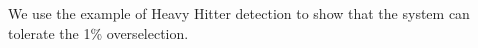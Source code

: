 \documentclass[a4paper,10pt]{article}
\title{}
\author{}
\begin{document}
\maketitle
We use the example of Heavy Hitter detection to show that the system can tolerate the 1\% overselection.


\section{}
\end{document}
